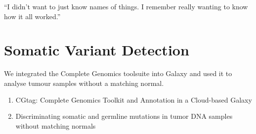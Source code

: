 \begin{savequote}[75mm]
“I didn’t want to just know names of things. I remember really wanting to know how it all worked.”
\end{savequote}

\chapter{Somatic Variant Detection}\label{chapter:virtualnormal}
\setcounter{figure}{-1}
\setcounter{table}{-1}
\setcounter{section}{-1}

We integrated the Complete Genomics toolsuite into Galaxy and used it to analyse tumour samples without a matching normal.

\begin{enumerate}
\itemsep-0.5em
\item CGtag: Complete Genomics Toolkit and Annotation in a Cloud-based Galaxy
\item Discriminating somatic and germline mutations in tumor DNA samples without matching normals
\end{enumerate}
